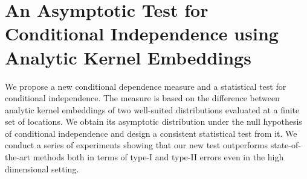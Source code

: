 \chapter{An Asymptotic Test for Conditional Independence using Analytic Kernel Embeddings}

We propose a new conditional dependence measure and a statistical test for conditional independence. The measure is based on the difference between analytic kernel embeddings of two well-suited distributions evaluated at a finite set of locations. We obtain its asymptotic distribution under the null hypothesis of conditional independence and design a consistent statistical test from it. We conduct a series of experiments showing that our new test outperforms state-of-the-art methods both in terms of type-I and type-II errors even in the high dimensional setting.


%



 



